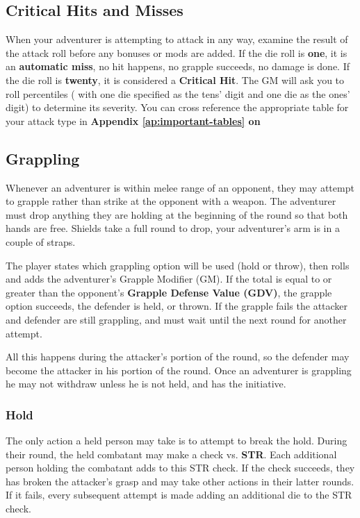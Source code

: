 \begin{multicols*}{2}
\subsection{Critical Hits and Misses}
When your adventurer is attempting to attack in any way, examine the result of the attack roll before any bonuses or mods are added. If the die roll is \textbf{one}, it is an \textbf{automatic miss}, no hit happens, no grapple succeeds, no damage is
done. If the die roll is \textbf{twenty}, it is considered a \textbf{Critical Hit}. The GM will ask you to roll percentiles ( with one die specified as the tens' digit and one die as the ones' digit) to determine its severity. You can cross reference the appropriate table for your attack type in \textbf{Appendix \ref{ap:important-tables} on \tcpage{\pageref{critical-hits}}}
\subsection{Grappling}
Whenever an adventurer is within melee range of an opponent, they may attempt to grapple rather than strike at the opponent with a weapon. The adventurer must drop anything they are holding at the beginning of the round so that both hands are free. Shields take a full round to drop, your adventurer's arm is in a couple of straps.

The player states which grappling option will be used (hold or throw), then rolls  and adds the adventurer's Grapple Modifier (GM). If the total is equal to or greater than the opponent's \textbf{Grapple Defense Value (GDV)}, the grapple option succeeds, the defender is held, or thrown. If the grapple fails the attacker and defender are still grappling, and must wait until the next round for another attempt.

All this happens during the attacker's portion of the round, so the defender may become the attacker in his portion of the round. Once an adventurer is grappling he may not withdraw unless he is not held, and has the initiative.
\subsubsection{Hold}
The only action a held person may take is to attempt to break the hold. During their round, the held combatant may make a  check vs. \textbf{STR}. Each additional person holding the combatant adds  to this STR check. If the check succeeds, they has broken the attacker's grasp and may take other actions in their latter rounds. If it fails, every subsequent attempt is made adding an additional die to the STR check.

\end{multicols*}
